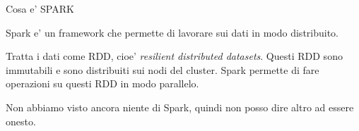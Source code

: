 \begin{domanda}
    Cosa e' SPARK
\end{domanda}

Spark e' un framework che permette di lavorare sui dati in modo distribuito.

Tratta i dati come RDD, cioe' \textit{resilient distributed datasets}. Questi
RDD sono immutabili e sono distribuiti sui nodi del cluster. Spark permette di
fare operazioni su questi RDD in modo parallelo.

Non abbiamo visto ancora niente di Spark, quindi non posso dire altro ad essere onesto.

